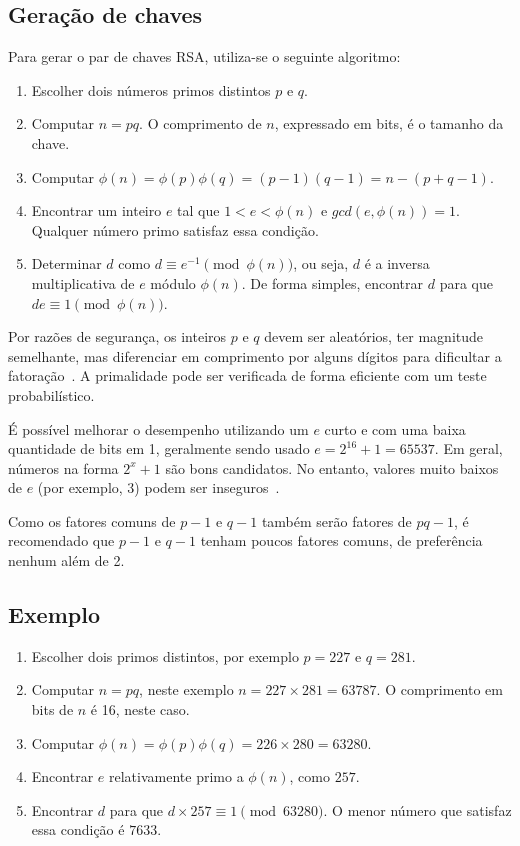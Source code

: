 \documentclass[12pt]{article}
\begin{document}
\subsection{Geração de chaves}

Para gerar o par de chaves RSA, utiliza-se o seguinte algoritmo:

\begin{enumerate}
    \item Escolher dois números primos distintos $p$ e $q$.
    \item Computar $n = pq$. O comprimento de $n$, expressado em bits, é o
        tamanho da chave.
    \item Computar $\phi(n) = \phi(p)\phi(q) = (p-1)(q-1) = n-(p+q-1)$.
    \item Encontrar um inteiro $e$ tal que $1 < e < \phi(n)$ e
        $gcd(e, \phi(n)) = 1$. Qualquer número primo satisfaz essa condição.
    \item Determinar $d$ como $d \equiv e^{-1} \pmod{\phi(n)}$, ou seja, $d$ é
        a inversa multiplicativa de $e$ módulo $\phi(n)$. De forma simples,
        encontrar $d$ para que $de \equiv 1 \pmod{\phi(n)}$.
\end{enumerate}

Por razões de segurança, os inteiros $p$ e $q$ devem ser aleatórios, ter
magnitude semelhante, mas diferenciar em comprimento por alguns dígitos para
dificultar a fatoração~\cite{rivest:78}. A primalidade pode ser verificada de
forma eficiente com um teste probabilístico.

É possível melhorar o desempenho utilizando um $e$ curto e com uma baixa
quantidade de bits em 1, geralmente sendo usado $e = 2^{16}+1 = 65537$. Em
geral, números na forma $2^{x}+1$ são bons candidatos. No entanto, valores
muito baixos de $e$ (por exemplo, 3) podem ser inseguros~\cite{boneh:99}.

Como os fatores comuns de $p-1$ e $q-1$ também serão fatores de $pq-1$, é
recomendado que $p-1$ e $q-1$ tenham poucos fatores comuns, de preferência
nenhum além de 2.

\subsection{Exemplo}

\begin{enumerate}
    \item Escolher dois primos distintos, por exemplo $p = 227$ e $q = 281$.
    \item Computar $n = pq$, neste exemplo $n = 227 \times 281 = 63787$. O
        comprimento em bits de $n$ é 16, neste caso.
    \item Computar $\phi(n) = \phi(p)\phi(q) = 226 \times 280 = 63280$.
    \item Encontrar $e$ relativamente primo a $\phi(n)$, como $257$.
    \item Encontrar $d$ para que $d \times 257 \equiv 1 \pmod{63280}$. O menor
        número que satisfaz essa condição é $7633$.
\end{enumerate}
\end{document}
